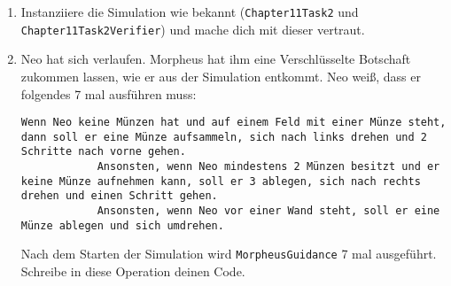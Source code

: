 
\begin{enumerate}
	\item
		Instanziiere die Simulation wie bekannt (\lstinline{Chapter11Task2} und \lstinline{Chapter11Task2Verifier}) und mache dich mit dieser vertraut.
	\item 
		Neo hat sich verlaufen. Morpheus hat ihm eine Verschlüsselte Botschaft zukommen lassen, wie er aus der Simulation entkommt. Neo weiß, dass er folgendes 7 mal ausführen muss:
		\begin{lstlisting}[breaklines=true, numbers=none]
			Wenn Neo keine Münzen hat und auf einem Feld mit einer Münze steht, dann soll er eine Münze aufsammeln, sich nach links drehen und 2 Schritte nach vorne gehen.
			Ansonsten, wenn Neo mindestens 2 Münzen besitzt und er keine Münze aufnehmen kann, soll er 3 ablegen, sich nach rechts drehen und einen Schritt gehen.
			Ansonsten, wenn Neo vor einer Wand steht, soll er eine Münze ablegen und sich umdrehen.
		\end{lstlisting}
		Nach dem Starten der Simulation wird \lstinline{MorpheusGuidance} 7 mal ausgeführt. Schreibe in diese Operation deinen Code.
\end{enumerate}

\newpage
